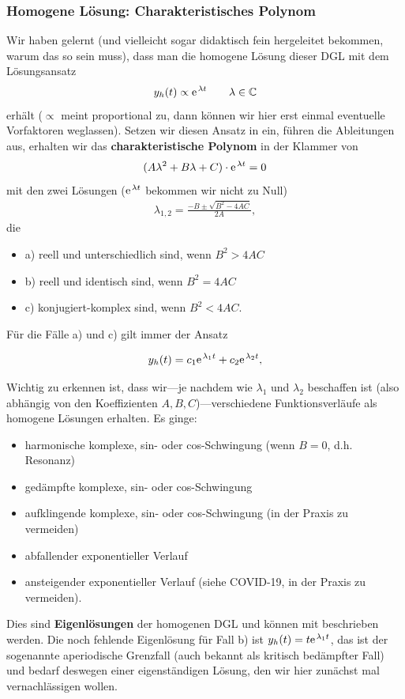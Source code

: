 \subsubsection{Homogene Lösung: Charakteristisches Polynom}
%
Wir haben gelernt (und vielleicht sogar didaktisch fein hergeleitet bekommen,
warum das so sein muss), dass man die homogene Lösung dieser DGL mit dem
Lösungsansatz
\begin{equation}
y_h(t) \propto \e^{\lambda t}\qquad \lambda\in\mathbb{C}
\end{equation}
erhält ($\propto$ meint proportional zu, dann können wir hier erst einmal
eventuelle Vorfaktoren weglassen).
%
Setzen wir diesen Ansatz in  ein, führen die Ableitungen
aus, erhalten wir das \textbf{charakteristische Polynom} in der Klammer von
\begin{equation}
(A \lambda^2 + B \lambda + C) \cdot \e^{\lambda t} = 0
\end{equation}
mit den zwei Lösungen ($\e^{\lambda t}$ bekommen wir nicht zu Null)
\begin{align}
\label{eq:A7BEE9E24E_lambdas}
\lambda_{1,2} = \frac{-B \pm \sqrt{B^2-4 A C}}{2 A},
\end{align}
die
\begin{itemize}
  \item a) reell und unterschiedlich sind, wenn $B^2>4 A C$
  \item b) reell und identisch sind, wenn $B^2 = 4 A C$
  \item c) konjugiert-komplex sind, wenn $B^2<4 A C$.
\end{itemize}
%
Für die Fälle a) und c) gilt immer der Ansatz
\begin{mdframed}[backgroundcolor=C3!10]
\begin{align}
\label{eq:A7BEE9E24E_Eigenloesungen}
y_h(t) = c_1 \e^{\lambda_1 t} + c_2 \e^{\lambda_2 t},
\end{align}
\end{mdframed}
%
Wichtig zu erkennen ist, dass wir---je nachdem wie $\lambda_1$ und $\lambda_2$
beschaffen ist (also abhängig von den Koeffizienten $A,B,C$)---verschiedene
Funktionsverläufe als homogene Lösungen erhalten.
Es ginge:
\begin{itemize}
  \item harmonische komplexe, sin- oder cos-Schwingung (wenn $B=0$, d.h. Resonanz)
  \item gedämpfte komplexe, sin- oder cos-Schwingung
  \item aufklingende komplexe, sin- oder cos-Schwingung (in der Praxis zu vermeiden)
  \item abfallender exponentieller Verlauf
  \item ansteigender exponentieller Verlauf (siehe COVID-19, in der Praxis zu vermeiden).
\end{itemize}
Dies sind \textbf{Eigenlösungen} der homogenen DGL und können mit
 beschrieben werden.
%
Die noch fehlende Eigenlösung für Fall b) ist $y_h(t) = t \e^{\lambda_1 t}$, das
ist der sogenannte aperiodische Grenzfall (auch bekannt als kritisch bedämpfter Fall)
und bedarf deswegen einer eigenständigen Lösung,
den wir hier zunächst mal vernachlässigen wollen.

